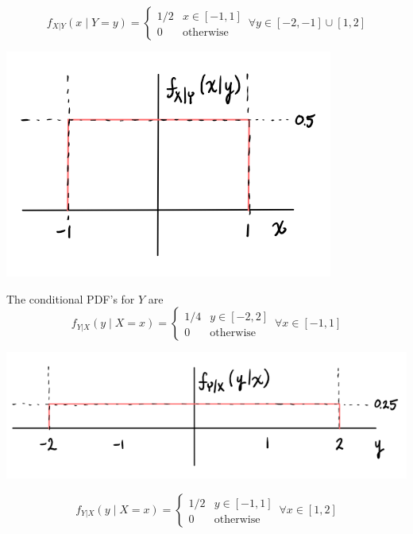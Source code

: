 \documentclass{article}
\begin{document}
$$ f_{X|Y}(x \mid Y = y) = \begin{cases}
    1/2 & x \in [-1, 1] \\
    0 & \mathrm{otherwise}
\end{cases}\, \forall y \in [-2, -1] \cup [1, 2] $$

\begin{center}
    \includegraphics[scale=1]{Images/P1Aiv.PNG}
\end{center}

The conditional PDF's for $Y$ are
$$ f_{Y|X}(y \mid X = x) = \begin{cases}
    1/4 & y \in [-2, 2] \\
    0 & \mathrm{otherwise}
\end{cases}\, \forall x \in [-1, 1] $$

\begin{center}
    \includegraphics[scale=1]{Images/P1Av.PNG}
\end{center}

$$ f_{Y|X}(y \mid X = x) = \begin{cases}
    1/2 & y \in [-1, 1] \\
    0 & \mathrm{otherwise}
\end{cases}\, \forall x \in [1, 2] $$
\end{document}
